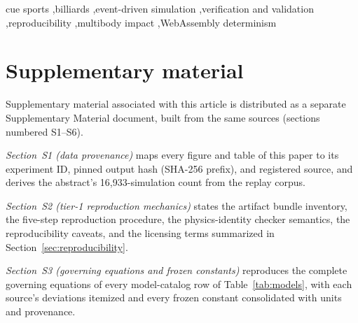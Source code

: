 \documentclass[review,12pt,authoryear]{elsarticle}
\begin{document}
\begin{frontmatter}
\begin{keyword}
cue sports \sep billiards \sep event-driven simulation \sep verification and
validation \sep reproducibility \sep multibody impact \sep WebAssembly
determinism
\end{keyword}

\end{frontmatter}

\tableofcontents
\clearpage


\linenumbers












\section*{Supplementary material}
\label{sec:supplementary}

Supplementary material associated with this article is distributed as a
separate Supplementary Material document, built from the same sources
(sections numbered S1--S6).

\emph{Section~S1 (data provenance)} maps every figure and table of this
paper to its experiment ID, pinned output hash (SHA-256 prefix), and
registered source, and derives the abstract's 16{,}933-simulation count
from the replay corpus.

\emph{Section~S2 (tier-1 reproduction mechanics)} states the artifact
bundle inventory, the five-step reproduction procedure, the
physics-identity checker semantics, the reproducibility caveats, and the
licensing terms summarized in Section~\ref{sec:reproducibility}.

\emph{Section~S3 (governing equations and frozen constants)} reproduces
the complete governing equations of every model-catalog row of
Table~\ref{tab:models}, with each source's deviations itemized and every
frozen constant consolidated with units and provenance.
\end{document}
